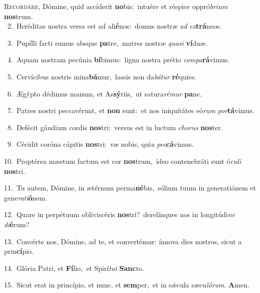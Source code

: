 \lettrine{\initial\textcolor{\initialcolor}{R}}{ecordáre,} Dómine, quid accíderit \textbf{no}\-bis:~\star intuére et réspice oppró\-\textit{bri}\-\textit{um} \textbf{nos}\-trum.\\
{\numbfont\textcolor{\numbcolor}{~2.}}~Heréditas nostra versa est ad ali\-\textbf{é}\-nos:~\star domus nostræ \textit{ad} \textit{ex}\-\textbf{trá}neos.\par
{\numbfont\textcolor{\numbcolor}{~3.}}~Pupílli facti sumus absque \textbf{pa}\-tre,~\star matres nostræ \textit{qua}\-\textit{si} \textbf{ví}\-duæ.\par
{\numbfont\textcolor{\numbcolor}{~4.}}~Aquam nostram pecúnia \textbf{bí}\-bimus:~\star ligna nostra prétio \textit{com}\-\textit{pa}\textbf{rá}vimus.\par
{\numbfont\textcolor{\numbcolor}{~5.}}~Cervícibus nostris mina\-\textbf{bá}\-mur,~\star lassis non da\-\textit{bá}\-\textit{tur} \textbf{ré}\-quies.\par
{\numbfont\textcolor{\numbcolor}{~6.}}~Ægýpto dédimus manum, et As\-\textbf{sý}\-riis,~\star ut satura\-\textit{ré}\-\textit{mur} \textbf{pa}\-ne.\par
{\numbfont\textcolor{\numbcolor}{~7.}}~Patres nostri peccavérunt, et \textbf{non} sunt:~\star et nos iniquitátes eó\textit{rum} \textit{por}\-\textbf{tá}vimus.\par
{\numbfont\textcolor{\numbcolor}{~8.}}~Defécit gáudium cordis \textbf{nos}\-tri:~\star versus est in luctum \textit{cho}\-\textit{rus} \textbf{nos}\-ter.\par
{\numbfont\textcolor{\numbcolor}{~9.}}~Cécidit coróna cápitis \textbf{nos}\-tri:~\star væ nobis, qui\textit{a} \textit{pec}\-\textbf{cá}vimus.\par
{\numbfont\textcolor{\numbcolor}{10.}}~Proptérea mæstum factum est cor \textbf{nos}\-trum,~\star ídeo contenebráti sunt ó\-\textit{cu}\-\textit{li} \textbf{nos}\-tri.\par
{\numbfont\textcolor{\numbcolor}{11.}}~Tu autem, Dómine, in ætérnum perma\-\textbf{né}\-bis,~\star sólium tuum in generatiónem et gene\-\textit{ra}\-\textit{ti}\textbf{ó}nem.\par
{\numbfont\textcolor{\numbcolor}{12.}}~Quare in perpétuum obliviscéris \textbf{nos}\-tri?~\star derelínques nos in longitúdi\textit{ne} \textit{di}\-\textbf{é}rum?\par
{\numbfont\textcolor{\numbcolor}{13.}}~Convérte nos, Dómine, ad te, et convertémur: ínnova dies nostros, sicut a prin\-\textbf{cí}\-pio.\par
{\numbfont\textcolor{\numbcolor}{14.}}~Glória Patri, et \textbf{Fí}\-lio,~\star et Spirí\-\textit{tu}\-\textit{i} \textbf{Sanc}\-to.\par
{\numbfont\textcolor{\numbcolor}{15.}}~Sicut erat in princípio, et nunc, et \textbf{sem}\-per,~\star et in sǽcula sæcu\-\textit{ló}\-\textit{rum}. \textbf{A}\-men.\par
